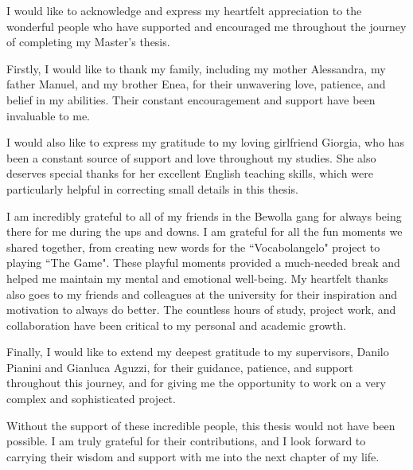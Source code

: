 \begin{acknowledgements} %
I would like to acknowledge and express my heartfelt appreciation to the wonderful people who have supported and encouraged me throughout the journey of completing my Master's thesis.\newline

Firstly, I would like to thank my family, including my mother Alessandra, my father Manuel, and my brother Enea, for their unwavering love, patience, and belief in my abilities. Their constant encouragement and support have been invaluable to me.\newline

I would also like to express my gratitude to my loving girlfriend Giorgia, who has been a constant source of support and love throughout my studies. She also deserves special thanks for her excellent English teaching skills, which were particularly helpful in correcting small details in this thesis.\newline

I am incredibly grateful to all of my friends in the Bewolla gang for always being there for me during the ups and downs. I am grateful for all the fun moments we shared together, from creating new words for the ``Vocabolangelo" project to playing ``The Game". These playful moments provided a much-needed break and helped me maintain my mental and emotional well-being. My heartfelt thanks also goes to my friends and colleagues at the university for their inspiration and motivation to always do better. The countless hours of study, project work, and collaboration have been critical to my personal and academic growth.\newline

Finally, I would like to extend my deepest gratitude to my supervisors, Danilo Pianini and Gianluca Aguzzi, for their guidance, patience, and support throughout this journey, and for giving me the opportunity to work on a very complex and
sophisticated project.\newline

Without the support of these incredible people, this thesis would not have been possible. I am truly grateful for their contributions, and I look forward to carrying their wisdom and support with me into the next chapter of my life.
\end{acknowledgements}
